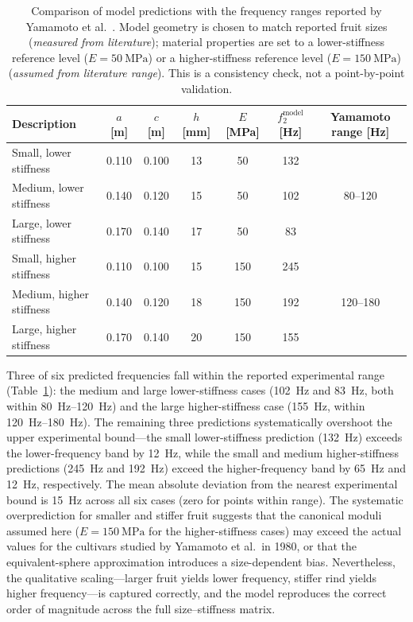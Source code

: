 \begin{table}[t]
  \centering
  \caption{Comparison of model predictions with the frequency ranges
    reported by Yamamoto et al.~\cite{Yamamoto1980}.  Model geometry is
    chosen to match reported fruit sizes (\emph{measured from literature});
    material properties are set to
    a lower-stiffness reference level ($E = \SI{50}{\mega\pascal}$) or a higher-stiffness
    reference level ($E = \SI{150}{\mega\pascal}$) (\emph{assumed from literature
    range}).  This is a consistency check, not a point-by-point
    validation.}
  \label{tab:yamamoto}
  \begin{tabular}{lcccccc}
    \toprule
    Description & $a$ [m] & $c$ [m] & $h$ [mm] & $E$ [MPa]
      & $f_2^{\mathrm{model}}$ [Hz] & Yamamoto range [Hz] \\
    \midrule
    Small, lower stiffness  & 0.110 & 0.100 & 13 & 50  & 132 & \multirow{3}{*}{80--120} \\
    Medium, lower stiffness & 0.140 & 0.120 & 15 & 50  & 102 & \\
    Large, lower stiffness  & 0.170 & 0.140 & 17 & 50  &  83 & \\[3pt]
    Small, higher stiffness & 0.110 & 0.100 & 15 & 150 & 245 & \multirow{3}{*}{120--180} \\
    Medium, higher stiffness & 0.140 & 0.120 & 18 & 150 & 192 & \\
    Large, higher stiffness & 0.170 & 0.140 & 20 & 150 & 155 & \\
    \bottomrule
  \end{tabular}
\end{table}

Three of six predicted frequencies fall within the reported
experimental range (Table~\ref{tab:yamamoto}): the medium and large
lower-stiffness cases (\SI{102}{\hertz} and \SI{83}{\hertz}, both within
\SIrange{80}{120}{\hertz}) and the large higher-stiffness case
(\SI{155}{\hertz}, within \SIrange{120}{180}{\hertz}).  The remaining
three predictions systematically overshoot the upper experimental
bound---the small lower-stiffness prediction (\SI{132}{\hertz}) exceeds the
lower-frequency band by \SI{12}{\hertz}, while the small and medium higher-stiffness
predictions (\SI{245}{\hertz} and \SI{192}{\hertz}) exceed the
higher-frequency band by \SI{65}{\hertz} and \SI{12}{\hertz}, respectively.
The mean absolute deviation from the nearest experimental bound is
\SI{15}{\hertz} across all six cases (zero for points within range).
The systematic overprediction for smaller and stiffer fruit suggests
that the canonical moduli assumed here
($E = \SI{150}{\mega\pascal}$ for the higher-stiffness cases) may exceed the actual
values for the cultivars studied by Yamamoto et al.\ in 1980, or
that the equivalent-sphere approximation introduces a size-dependent
bias.  Nevertheless, the qualitative scaling---larger fruit yields
lower frequency, stiffer rind yields higher frequency---is captured
correctly, and the model reproduces the correct order of magnitude
across the full size--stiffness matrix.

